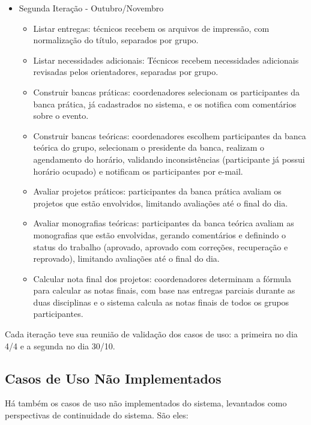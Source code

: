 \begin{itemize}
    \item Segunda Iteração - Outubro/Novembro
    \begin{itemize}
        \item Listar entregas: técnicos recebem os arquivos de impressão, com normalização do título, separados por grupo.
        \item Listar necessidades adicionais: Técnicos recebem necessidades adicionais revisadas pelos orientadores, separadas por grupo.
        \item Construir bancas práticas: coordenadores selecionam os participantes da banca prática, já cadastrados no sistema, e os notifica com comentários sobre o evento.
        \item Construir bancas teóricas: coordenadores escolhem participantes da banca teórica do grupo, selecionam o presidente da banca, realizam o agendamento do horário, validando inconsistências (participante já possui horário ocupado) e notificam os participantes por e-mail.
        \item Avaliar projetos práticos: participantes da banca prática avaliam os projetos que estão envolvidos, limitando avaliações até o final do dia.
        \item Avaliar monografias teóricas: participantes da banca teórica avaliam as monografias que estão envolvidas, gerando comentários e definindo o status do trabalho (aprovado, aprovado com correções, recuperação e reprovado), limitando avaliações até o final do dia.
        \item Calcular nota final dos projetos: coordenadores determinam a fórmula para calcular as notas finais, com base nas entregas parciais durante as duas disciplinas e o sistema calcula as notas finais de todos os grupos participantes.
    \end{itemize}
\end{itemize}

Cada iteração teve sua reunião de validação dos casos de uso: a primeira no dia 4/4 e a segunda no dia 30/10.

\subsection{Casos de Uso Não Implementados}
Há também os casos de uso não implementados do sistema, levantados como perspectivas de continuidade do sistema. São eles:

